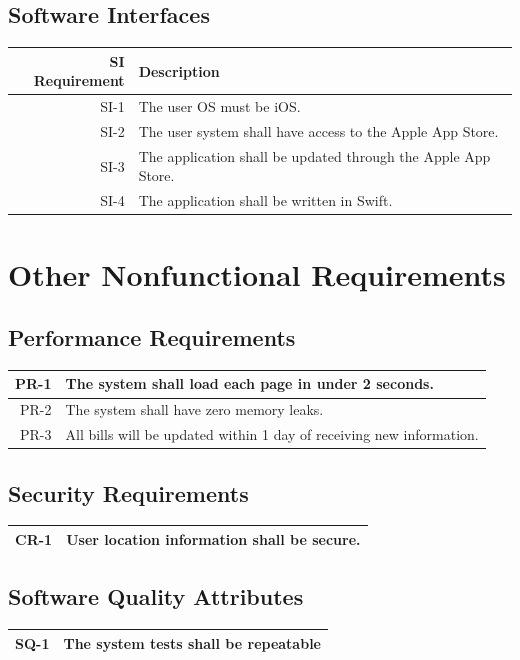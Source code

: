 \documentclass[12pt,oneside,letterpaper]{article}
\newcounter{use_case}
\newcounter{functional_requirement}
\begin{document}
\subsection{Software Interfaces}
\begin{longtabu}{|r|X|}
  \hline
  SI Requirement & Description \\
  \hline
  SI-1 & The user OS must be iOS.\\
  \hline
  SI-2 &  The user system shall have access to the Apple App Store. \\
  \hline
  SI-3 & The application shall be updated through the Apple App Store.\\
  \hline
  SI-4 & The application shall be written in Swift.\\
  \hline
\end{longtabu}

\section{Other Nonfunctional Requirements}
\subsection{Performance Requirements}
\begin{longtabu} {|r|X|}
  \hline
  PR-1 & The system shall load each page in under 2 seconds. \\
  \hline
  PR-2 & The system shall have zero memory leaks. \\
  \hline
  PR-3 & All bills will be updated within 1 day of receiving new information. \\
  \hline
\end{longtabu}

\subsection{Security Requirements}
\begin{longtabu}{|r|X|}
  \hline
  CR-1 & User location information shall be secure.\\
  \hline
\end{longtabu}

\subsection{Software Quality Attributes}
\begin{longtabu} {|r|X|}
  \hline
  SQ-1 & The system tests shall be repeatable\\
  \hline
\end{longtabu}
\end{document}
